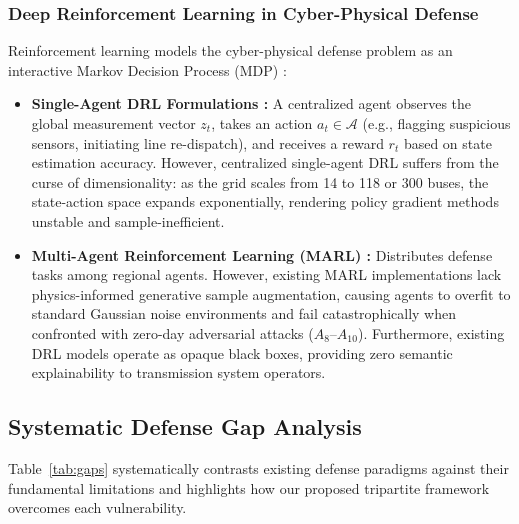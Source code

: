 \documentclass[journal,compsoc]{IEEEtran}
\begin{document}
\subsubsection{Deep Reinforcement Learning in Cyber-Physical Defense}
Reinforcement learning models the cyber-physical defense problem as an interactive Markov Decision Process (MDP) \cite{ref34}:
\begin{itemize}
    \item \textbf{Single-Agent DRL Formulations \cite{ref34}:} A centralized agent observes the global measurement vector $z_t$, takes an action $a_t \in \mathcal{A}$ (e.g., flagging suspicious sensors, initiating line re-dispatch), and receives a reward $r_t$ based on state estimation accuracy. However, centralized single-agent DRL suffers from the curse of dimensionality: as the grid scales from 14 to 118 or 300 buses, the state-action space expands exponentially, rendering policy gradient methods unstable and sample-inefficient.
    \item \textbf{Multi-Agent Reinforcement Learning (MARL) \cite{ref53, ref79}:} Distributes defense tasks among regional agents. However, existing MARL implementations lack physics-informed generative sample augmentation, causing agents to overfit to standard Gaussian noise environments and fail catastrophically when confronted with zero-day adversarial attacks ($A_8$--$A_{10}$). Furthermore, existing DRL models operate as opaque black boxes, providing zero semantic explainability to transmission system operators.
\end{itemize}

\subsection{Systematic Defense Gap Analysis}
Table~\ref{tab:gaps} systematically contrasts existing defense paradigms against their fundamental limitations and highlights how our proposed tripartite framework overcomes each vulnerability.
\end{document}
